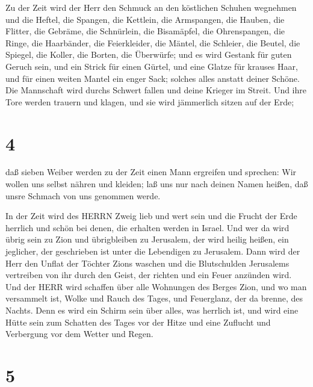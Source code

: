  Zu der Zeit wird der Herr den Schmuck an den köstlichen
Schuhen wegnehmen und die Heftel, die Spangen,  die
Kettlein, die Armspangen, die Hauben,  die Flitter, die
Gebräme, die Schnürlein, die Bisamäpfel, die Ohrenspangen, 
die Ringe, die Haarbänder,  die Feierkleider, die Mäntel,
die Schleier, die Beutel,  die Spiegel, die Koller, die
Borten, die Überwürfe;  und es wird Gestank für guten
Geruch sein, und ein Strick für einen Gürtel, und eine Glatze für
krauses Haar, und für einen weiten Mantel ein enger Sack; solches alles
anstatt deiner Schöne.  Die Mannschaft wird durchs Schwert
fallen und deine Krieger im Streit.  Und ihre Tore werden
trauern und klagen, und sie wird jämmerlich sitzen auf der Erde;

\hypertarget{section-3}{%
\section{4}\label{section-3}}

 daß sieben Weiber werden zu der Zeit einen Mann ergreifen
und sprechen: Wir wollen uns selbst nähren und kleiden; laß uns nur nach
deinen Namen heißen, daß unsre Schmach von uns genommen werde.

 In der Zeit wird des HERRN Zweig lieb und wert sein und die
Frucht der Erde herrlich und schön bei denen, die erhalten werden in
Israel.  Und wer da wird übrig sein zu Zion und übrigbleiben
zu Jerusalem, der wird heilig heißen, ein jeglicher, der geschrieben ist
unter die Lebendigen zu Jerusalem.  Dann wird der Herr den
Unflat der Töchter Zions waschen und die Blutschulden Jerusalems
vertreiben von ihr durch den Geist, der richten und ein Feuer anzünden
wird.  Und der HERR wird schaffen über alle Wohnungen des
Berges Zion, und wo man versammelt ist, Wolke und Rauch des Tages, und
Feuerglanz, der da brenne, des Nachts. Denn es wird ein Schirm sein über
alles, was herrlich ist,  und wird eine Hütte sein zum
Schatten des Tages vor der Hitze und eine Zuflucht und Verbergung vor
dem Wetter und Regen.

\hypertarget{section-4}{%
\section{5}\label{section-4}}

